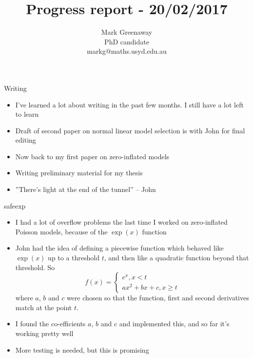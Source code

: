 \documentclass{beamer}
\title{Progress report - 20/02/2017}
\author{Mark Greenaway\\PhD candidate\\markg@maths.usyd.edu.au}
\begin{document}
\begin{frame}
\maketitle
\end{frame}

\begin{frame}{Writing}
\begin{itemize}
\item I've learned a lot about writing in the past few months. I still have a lot left to learn
\item Draft of second paper on normal linear model selection is with John for final editing
\item Now back to my first paper on zero-inflated models
\item Writing preliminary material for my thesis
\item ''There's light at the end of the tunnel'' -- John
\end{itemize}
\end{frame}

\begin{frame}{safeexp}
\begin{itemize}
\item I had a lot of overflow problems the last time I worked on zero-inflated Poisson models, because of the
			$\exp(x)$ function
\item John had the idea of defining a piecewise function which behaved like $\exp(x)$ up to a threshold $t$,
			and then like	a quadratic function beyond that threshold. So
			$$f(x) = 
			\begin{cases}
			e^{x}, x < t \\
			a x^2 + b x + c, x \geq t
			\end{cases}
			$$
			where $a$, $b$ and $c$ were chosen so that the function, first and second derivatives match at the
			point $t$.
\item I found the co-efficients $a$, $b$ and $c$ and implemented this, and so far it's working pretty well
\item More testing is needed, but this is promising
\end{itemize}
\end{frame}
\end{document}
